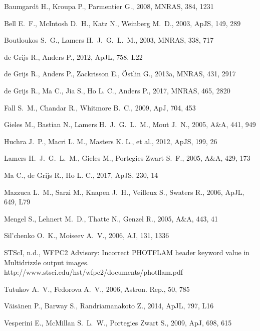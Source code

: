 \documentclass{raa}            %
\begin{document}
\begin{thebibliography}{99}

 Baumgardt H., Kroupa P., Parmentier G., 2008,
  MNRAS, 384, 1231

 Bell E.~F., McIntosh D.~H., Katz N., Weinberg
  M.~D., 2003, ApJS, 149, 289

 Boutloukos S.~G., Lamers H.~J.~G.~L.~M., 2003,
  MNRAS, 338, 717

 de Grijs R., Anders P., 2012, ApJL, 758, L22

 de Grijs R., Anders P., Zackrisson E., \"Ostlin
  G., 2013a, MNRAS, 431, 2917

 de Grijs R., Ma C., Jia S., Ho L. C., Anders
  P., 2017, MNRAS, 465, 2820

 Fall S.~M., Chandar R., Whitmore B.~C., 2009,
  ApJ, 704, 453

 Gieles M., Bastian N., Lamers H.~J.~G.~L.~M.,
  Mout J.~N., 2005, A\&A, 441, 949

 Huchra J.~P., Macri L. M., Masters K. L., et
  al., 2012, ApJS, 199, 26

 Lamers H.~J.~G.~L.~M., Gieles M., Portegies
  Zwart S.~F., 2005, A\&A, 429, 173

 Ma C., de Grijs R., Ho L. C., 2017, ApJS, 230,
  14

 Mazzuca L.~M., Sarzi M., Knapen J.~H., Veilleux
  S., Swaters R., 2006, ApJL, 649, L79

 Mengel S., Lehnert M.~D., Thatte N., Genzel R.,
  2005, A\&A, 443, 41

 Sil'chenko O.~K., Moiseev A.~V., 2006, AJ, 131,
  1336

 STScI, n.d., WFPC2 Advisory: Incorrect PHOTFLAM
  header keyword value in Multidrizzle output
  images. http://www.stsci.edu/hst/wfpc2/documents/photflam.pdf

 Tutukov A.~V., Fedorova A.~V., 2006,
  Astron. Rep., 50, 785

 V{\"a}is{\"a}nen P., Barway S., Randriamanakoto
  Z., 2014, ApJL, 797, L16

 Vesperini E., McMillan S.~L.~W., Portegies
  Zwart S., 2009, ApJ, 698, 615

\end{thebibliography}

\label{lastpage}
\end{document}
